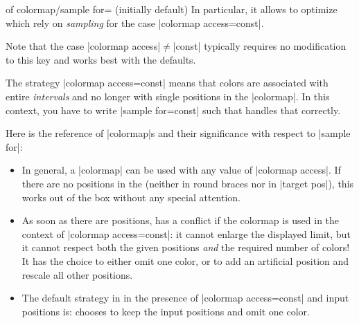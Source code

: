 {\begin{enumerate}
\begin{pgfplotskey}{of colormap/sample for= (initially default)}
            In particular, it allows to optimize 
            which rely on \emph{sampling} for the case |colormap access=const|.

            Note that the case |colormap access|$\neq$|const| typically
            requires no modification to this key and works best with the
            defaults.

            The strategy |colormap access=const| means that colors are
            associated with entire \emph{intervals} and no longer with single
            positions in the |colormap|. In this context, you have to write
            |sample for=const| such that \PGFPlots{} handles that correctly.

            Here is the reference of |colormap|s and their significance with
            respect to |sample for|:
            \begin{itemize}
                \item In general, a |colormap| can be used with any value
                    of |colormap access|. If there are no positions in the
                     (neither in round braces nor
                    in |target pos|), this works out of the box without any
                    special attention.
\begin{codeexample}[]
\pgfplotscolorbardrawstandalone[
    colormap={example}{
        samples of colormap={
            5 of viridis,
        },
    },
    colorbar horizontal,
    colormap access=const]
\end{codeexample}
                \item As soon as there are positions, \PGFPlots{} has a
                    conflict if the colormap is used in the context of
                    |colormap access=const|: it cannot enlarge the
                    displayed limit, but it cannot respect both the given
                    positions \emph{and} the required number of colors! It
                    has the choice to either omit one color, or to add an
                    artificial position and rescale all other positions.
                \item The default strategy in \PGFPlots{} in the presence
                    of |colormap access=const| and input positions is:
                    \PGFPlots{} chooses to keep the input positions and
                    omit one color.
\begin{codeexample}[]
\pgfplotscolorbardrawstandalone[
    colormap={example}{
        of colormap={
            viridis,
            target pos={0,500,850,950,1000},
        },
    },
    colorbar horizontal,
    colormap access=const]
\end{codeexample}


\end{itemize}
\end{pgfplotskey}
\end{enumerate}}
